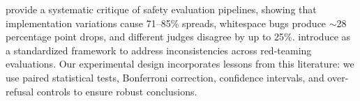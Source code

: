 \citet{safetyeval2025} provide a systematic critique of safety evaluation pipelines, showing that implementation variations cause 71--85\% \asr spreads, whitespace bugs produce $\sim$28 percentage point \asr drops, and different judges disagree by up to 25\%.
\citet{mazeika2024harmbench} introduce \harmbench as a standardized framework to address inconsistencies across red-teaming evaluations.
Our experimental design incorporates lessons from this literature: we use paired statistical tests, Bonferroni correction, confidence intervals, and over-refusal controls to ensure robust conclusions.
